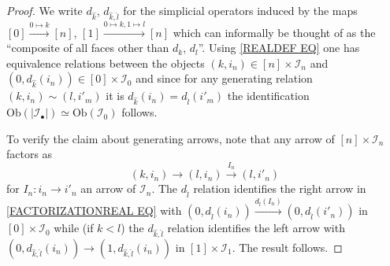\documentclass[a4paper,10pt
,draft
]{article}%
\numberwithin{equation}{section}
\numberwithin{figure}{section}
\theoremstyle{definition} %
\newcommand{\1}{\ensuremath{\mathbbm 1}}%
\begin{document}
\begin{proof}
	We write $d_{\hat{k}}$, $d_{\hat{k},\hat{l}}$ for the simplicial operators induced by the maps 
	$[0]\xrightarrow{0 \mapsto k} [n]$,
	$[1]\xrightarrow{0 \mapsto k,1 \mapsto l} [n]$
	which can informally be thought of as the ``composite of all faces other than $d_k$, $d_l$''.
Using \eqref{REALDEF EQ} one has equivalence relations
between the objects  
$(k,i_n) \in [n] \times \mathcal{I}_n$
and 
$(0,d_{\hat{k}}(i_n))
\in [0] \times \mathcal{I}_0$
and since for any generating relation $(k,i_n)\sim (l,i'_m)$
it is $d_{\hat{k}}(i_n) = d_{\hat{l}}(i'_m)$ the identification 
$\text{Ob}(|\mathcal{I}_{\bullet}|) \simeq \text{Ob}(\mathcal{I}_0)$
follows.


To verify the claim about generating arrows, note that any arrow of $[n]\times \mathcal{I}_n$ factors as 
\begin{equation}\label{FACTORIZATIONREAL EQ}
(k,i_n) \to (l,i_n)  \xrightarrow{I_n} (l,i'_n)
\end{equation}
for $I_n \colon i_n \to i'_n$
an arrow of $\mathcal{I}_n$. 
The $d_{\hat{l}}$ relation identifies the right arrow in 
\eqref{FACTORIZATIONREAL EQ}
with
$(0,d_{\hat{l}}(i_n))
	\xrightarrow{d_{\hat{l}}(I_n)}
(0,d_{\hat{l}}(i'_n))
$
in $[0]\times \mathcal{I}_0$
while (if $k<l$) the $d_{\hat{k},\hat{l}}$ relation identifies the left arrow with 
$(0,d_{\hat{k},\hat{l}}(i_n)) \to (1,d_{\hat{k},\hat{l}}(i_n))$
in $[1]\times \mathcal{I}_1$. The result follows.
\end{proof}
\end{document}
